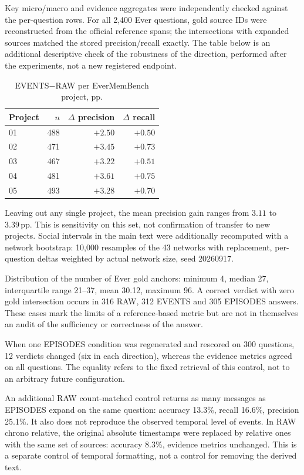 \documentclass[11pt,a4paper]{article}
\newcommand{\pp}{\,\text{pp}}
\begin{document}
Key micro/macro and evidence aggregates were independently checked against the
per-question rows. For all 2,400 Ever questions, gold source IDs were reconstructed
from the official reference spans; the intersections with expanded sources matched the
stored precision/recall exactly. The table below is an additional descriptive check of
the robustness of the direction, performed after the experiments, not a new registered
endpoint.

\begin{table}[ht]
\centering\small
\begin{tabular}{lrrr}
\toprule
Project & $n$ & $\Delta$ precision & $\Delta$ recall\\
\midrule
01 & 488 & $+2.50$ & $+0.50$\\
02 & 471 & $+3.45$ & $+0.73$\\
03 & 467 & $+3.22$ & $+0.51$\\
04 & 481 & $+3.61$ & $+0.75$\\
05 & 493 & $+3.28$ & $+0.70$\\
\bottomrule
\end{tabular}
\caption{EVENTS$-$RAW per EverMemBench project, pp.}
\end{table}

Leaving out any single project, the mean precision gain ranges from $3.11$ to
$3.39\pp$. This is sensitivity on this set, not confirmation of transfer to new
projects. Social intervals in the main text were additionally recomputed with a network
bootstrap: 10,000 resamples of the 43 networks with replacement, per-question deltas
weighted by actual network size, seed 20260917.

Distribution of the number of Ever gold anchors: minimum 4, median 27, interquartile
range 21--37, mean 30.12, maximum 96. A correct verdict with zero gold intersection
occurs in 316 RAW, 312 EVENTS and 305 EPISODES answers. These cases mark the limits of a
reference-based metric but are not in themselves an audit of the sufficiency or
correctness of the answer.

When one EPISODES condition was regenerated and rescored on 300 questions, 12 verdicts
changed (six in each direction), whereas the evidence metrics agreed on all questions.
The equality refers to the fixed retrieval of this control, not to an arbitrary future
configuration.

An additional RAW count-matched control returns as many messages as EPISODES expand on
the same question: accuracy 13.3\%, recall 16.6\%, precision 25.1\%. It also does not
reproduce the observed temporal level of events. In RAW chrono relative, the original
absolute timestamps were replaced by relative ones with the same set of sources:
accuracy 8.3\%, evidence metrics unchanged. This is a separate control of temporal
formatting, not a control for removing the derived text.
\end{document}
